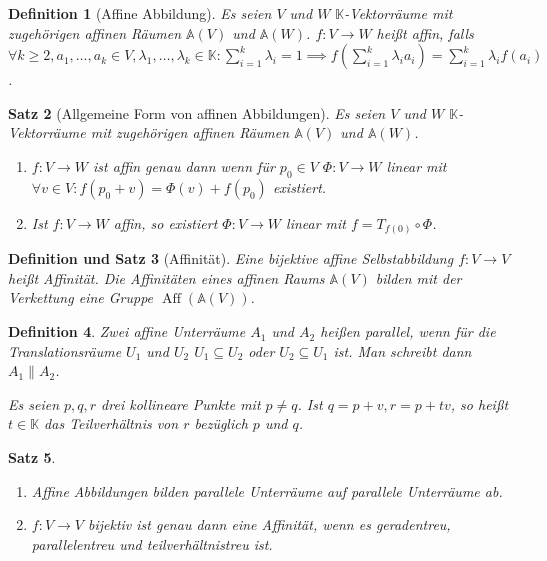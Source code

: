 \documentclass[a4paper]{article}
\newcounter{Sec}
\theoremstyle{marginbreak}
\newtheorem{definition}{Definition}[Sec]
\newtheorem{satz}[definition]{Satz}
\newtheorem{defsatz}[definition]{Definition und Satz}
\DeclareMathOperator{\Aff}{Aff}
\begin{document}
	\begin{definition}[Affine Abbildung]
		Es seien $V$ und $W$ $\mathbb{K}$-Vektorräume mit zugehörigen affinen Räumen
		$\mathbb{A}(V)$ und $\mathbb{A}(W)$. $f\colon V\to W$ heißt affin, falls
		$\forall k\geq 2, a_1,\ldots,a_k\in V, \lambda_1,\ldots, \lambda_k\in\mathbb{K}\colon \sum_{i=1}^k\lambda_i = 1
		\implies f(\sum_{i=1}^k\lambda_i a_i) = \sum_{i=1}^k\lambda_i f(a_i)$.
	\end{definition}
	\begin{satz}[Allgemeine Form von affinen Abbildungen]
		Es seien $V$ und $W$ $\mathbb{K}$-Vektorräume mit zugehörigen affinen Räumen
		$\mathbb{A}(V)$ und $\mathbb{A}(W)$.

		\begin{enumerate}[label=(\alph*)]
			\item $f\colon V\to W$ ist affin genau dann wenn für $p_0\in V$
				$\Phi\colon V\to W$ linear mit $\forall v\in V\colon f(p_0 + v) = \Phi(v) + f(p_0)$ existiert.
			\item Ist $f\colon V\to W$ affin, so existiert $\Phi\colon V\to W$ linear mit $f = T_{f(0)} \circ \Phi$.
		\end{enumerate}
	\end{satz}
	\begin{defsatz}[Affinität]
		Eine bijektive affine Selbstabbildung $f\colon V\to V$ heißt Affinität.
		Die Affinitäten eines affinen Raums $\mathbb{A}(V)$ bilden mit der Verkettung
		eine Gruppe $\Aff(\mathbb{A}(V))$.
	\end{defsatz}
	\begin{definition}
		Zwei affine Unterräume $A_1$ und $A_2$ heißen parallel, wenn für die
		Translationsräume $U_1$ und $U_2$ $U_1\subseteq U_2$ oder $U_2\subseteq U_1$ ist.
		Man schreibt dann $A_1\parallel A_2$.

		Es seien $p, q, r$ drei kollineare Punkte mit $p\neq q$. Ist $q = p + v, r = p+tv$, so
		heißt $t\in\mathbb{K}$ das Teilverhältnis von $r$ bezüglich $p$ und $q$.
	\end{definition}
	\begin{satz}
		\begin{enumerate}[label=(\alph*)]
			\item Affine Abbildungen bilden parallele Unterräume auf parallele Unterräume ab.
			\item $f\colon V\to V$ bijektiv ist genau dann eine Affinität, wenn es geradentreu,
				parallelentreu und teilverhältnistreu ist.
		\end{enumerate}
	\end{satz}
\end{document}
